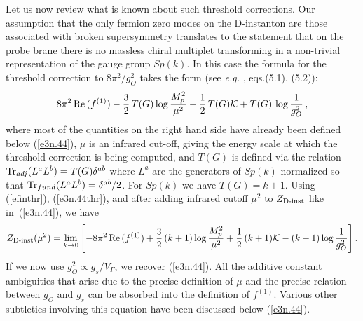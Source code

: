 \documentclass[12pt,a4paper]{article}
\newcommand{\be}{\begin{equation}}
\newcommand{\ee}{\end{equation}}
\newcommand{\refb}[1]{(\ref{#1})}
\def\Tr{{\rm Tr} }
\def\Re{\,{\rm Re}\,}
\def\[{\left[}
\def\]{\right]}
\newcommand{\cK}{\mathcal{K}}
\begin{document}
Let us now review what is known about such threshold corrections. Our assumption that
the only fermion zero modes on the D-instanton are those associated with broken
supersymmetry translates to the statement that on the probe brane there is no
massless chiral
multiplet transforming in a non-trivial representation of the gauge group $Sp(k)$.
In this case the formula for the threshold correction to $8\pi^2/g_O^2$
takes the form (see {\it e.g.}
\cite{Akerblom:2007uc}, eqs.(5.1), (5.2)):
\be\label{e3n.44thr}
 8\pi^2 \Re(f^{(1)}) -{3\over 2} \, T(G) \log{M_p^2\over \mu^2} -{1\over 2}\,  T(G) \cK
+ T(G) \, \log {1\over g_O^2}\, ,
\ee
where most of the quantities on the right hand side have already been defined below \refb{e3n.44},
$\mu$ is an infrared cut-off, giving the energy scale at which the threshold correction is being
computed, and $T(G)$ is defined via the relation $\Tr_{adj}(L^a L^b)=T(G) \delta^{ab}$ where
$L^a$ are the generators of $Sp(k)$ normalized so that $\Tr_{fund}(L^a L^b)=\delta^{ab}/2$.
For $Sp(k)$ we have $T(G)=k+1$. Using \refb{efinthr}, \refb{e3n.44thr},
and after adding infrared cutoff $\mu^2$ to
$Z_{\mbox{\scriptsize D-inst}}$ like in~\refb{e3n.44}, we have
\be\label{e3n.44thrnew}
Z_{\mbox{\scriptsize D-inst}}(\mu^2)
= \lim_{k\to 0} \[
-8\pi^2 \Re(f^{(1)}) + {3\over 2}\, (k+1) \log{M_p^2\over \mu^2} + {1\over 2} \,(k+1) \cK
- (k+1) \log {1\over g_O^2}\].
\ee
If we now use $g_O^2\propto g_s/V_\Gamma$,
we recover \refb{e3n.44}. All the additive constant ambiguities that arise due to the
precise definition of $\mu$ and the precise relation between $g_O$ and $g_s$
can be absorbed into the definition of $f^{(1)}$. Various other subtleties involving this
equation have been discussed below  \refb{e3n.44}.

%
\end{document}
